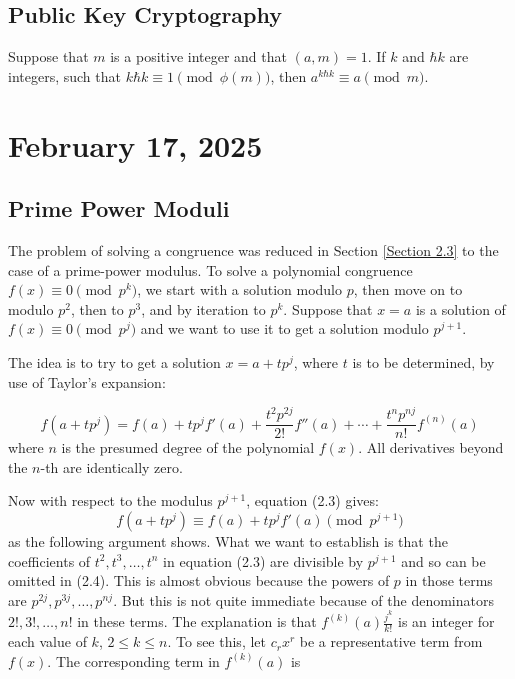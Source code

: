 \documentclass[11pt]{article}
\begin{document}
\subsection{Public Key Cryptography}
\begin{lemma}\label{2.22}
	Suppose that \(m \) is a positive integer and that \((a, m)=  1\). If \(k\) and \(\hbar{k}\) are integers, such that \(k \hbar{k} \equiv 1 \pmod{\phi (m)}\), then \(a^{k\hbar{k}} \equiv a \pmod{m}\).
\end{lemma}

\section{February 17, 2025}
\subsection{Prime Power Moduli}\label{Section 2.6}

The problem of solving a congruence was reduced in Section \cref{Section 2.3} to the case of a prime-power modulus. To solve a polynomial congruence \( f(x) \equiv 0 \pmod{p^k} \), we start with a solution modulo \( p \), then move on to modulo \( p^2 \), then to \( p^3 \), and by iteration to \( p^k \). Suppose that \( x = a \) is a solution of \( f(x) \equiv 0 \pmod{p^j} \) and we want to use it to get a solution modulo \( p^{j+1} \).

The idea is to try to get a solution \( x = a + tp^j \), where \( t \) is to be determined, by use of Taylor's expansion:

\[
	f(a + tp^j) = f(a) + tp^j f'(a) + \frac{t^2 p^{2j}}{2!} f''(a) + \cdots + \frac{t^n p^{nj}}{n!} f^{(n)}(a) \label{eq:2.3}
\]
where \( n \) is the presumed degree of the polynomial \( f(x) \). All derivatives beyond the \( n \)-th are identically zero.

Now with respect to the modulus \( p^{j+1} \), equation (2.3) gives:
\[f(a + tp^j) \equiv f(a) + tp^j f'(a) \pmod{p^{j+1}}\]
as the following argument shows. What we want to establish is that the coefficients of \( t^2, t^3, \ldots, t^n \) in equation (2.3) are divisible by \( p^{j+1} \) and so can be omitted in (2.4). This is almost obvious because the powers of \( p \) in those terms are \( p^{2j}, p^{3j}, \ldots, p^{nj} \). But this is not quite immediate because of the denominators \( 2!, 3!, \ldots, n! \) in these terms. The explanation is that \( f^{(k)}(a) \frac{j^k}{k!} \) is an integer for each value of \( k \), \( 2 \leq k \leq n \). To see this, let \( c_r x^r \) be a representative term from \( f(x) \). The corresponding term in \( f^{(k)}(a) \) is
\end{document}

